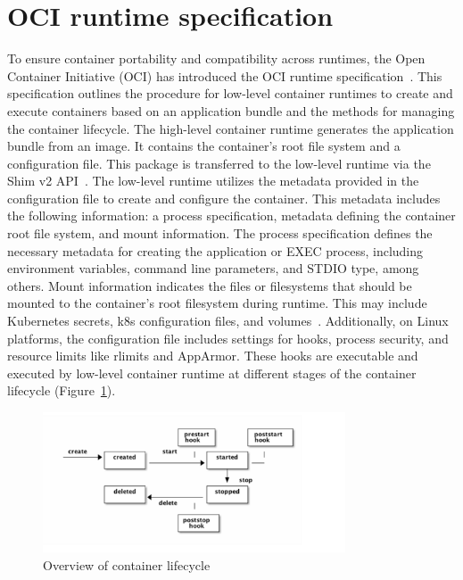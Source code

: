\section{OCI runtime specification}

To ensure container portability and compatibility across runtimes, the Open Container Initiative (OCI) has introduced the OCI runtime specification~\cite*{oci-runtime-spec}. This specification outlines the procedure for low-level container runtimes to create and execute containers based on an 
application bundle and the methods for managing the container lifecycle. The high-level container runtime generates the application bundle from an image. It contains the container's root file system and a configuration file. This package is transferred to the low-level runtime via the Shim v2 API~\cite*{shim_v2}. 
The low-level runtime utilizes the metadata provided in the configuration file to create and configure the container. This metadata includes the following information: a process specification, metadata defining the container root file system, and mount information. The process specification defines 
the necessary metadata for creating the application or EXEC process, including environment variables, command line parameters, and STDIO type, among others. Mount information indicates the files or filesystems that should be mounted to the container's root filesystem during runtime. This may include 
Kubernetes secrets, k8s configuration files, and volumes~\cite*{k8s}. Additionally, on Linux platforms, the configuration file includes settings for hooks,  process security, and resource limits like rlimits and  AppArmor. These hooks are executable and executed by low-level container runtime at 
different stages of the container lifecycle (Figure~\ref{fig:Container_Lifecycle_state}).
\begin{figure}[htp]
  \centering
  \includegraphics[width=0.8\textwidth]{images/Container_Lifecycle_state.PNG}
  \caption[Overview of container lifecycle]{Overview of container lifecycle}
  \label{fig:Container_Lifecycle_state}
\end{figure}

